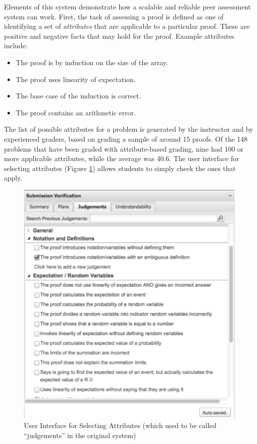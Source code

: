 \documentclass[12pt]{article}
\begin{document}
Elements of this system demonstrate 
how a scalable and reliable peer assessment system can work.  First,
the task of assessing a proof is defined as one of identifying a set of
{\em attributes} that are applicable to a particular proof.  These are
positive and negative facts that may hold for the proof.  Example
attributes include:
\begin{itemize}
\item The proof is by induction on the size of the array.
\item The proof uses linearity of expectation.
\item The base case of the induction is correct.
\item The proof contains an arithmetic error.
\end{itemize}

The list of possible attributes for a problem is generated by the
instructor and by experienced graders, based on grading a sample of
around 15 proofs.  Of the 148 problems that have been graded with
attribute-based grading, nine had 100 or more applicable attributes,
while the average was 40.6. The user interface for selecting attributes 
(Figure \ref{fig:verifications}) allows students to simply check the ones 
that apply.

\begin{figure}
\begin{center}
\includegraphics[scale=0.45]{list_verifications}
\end{center}
\caption{User Interface for Selecting Attributes (which used to be called ``judgements'' in the original system)}
\label{fig:verifications}
\end{figure}
\end{document}
